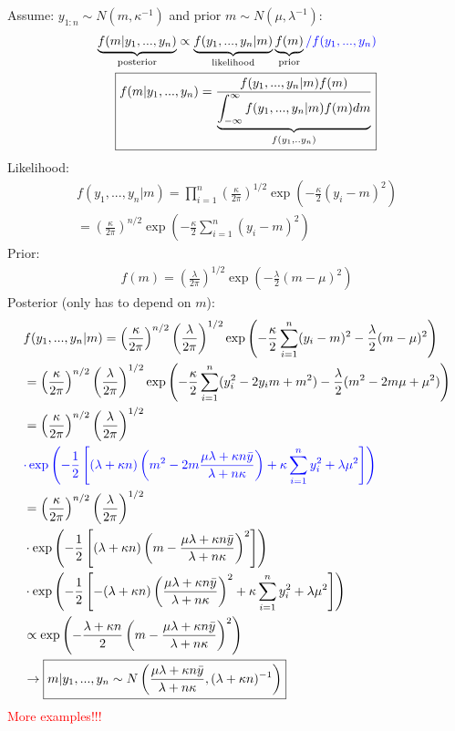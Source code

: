 \documentclass{article}\usepackage[]{graphicx}\usepackage[]{xcolor}
\begin{document}
\begin{multicols*}{2}
\begin{center}
\begin{tabular}{lll}
\end{tabular}
\end{center}
Assume: $y_{1:n}\sim N(m,\kappa^{-1})$ and prior $m\sim N(\mu,\lambda^{-1})$:
\begin{align*}
\underbrace{f(m|y_1,...,y_n)}_{\text{posterior}}\propto\underbrace{f(y_1,...,y_n|m)}_{\text{likelihood}}\underbrace{f(m)}_{\text{prior}}\textcolor{blue}{/f(y_1,...,y_n)}\\
\boxed{f(m|y_1,...,y_n)=\frac{f(y_1,...,y_n|m)f(m)}{\underbrace{\int_{-\infty}^{\infty}f(y_1,...,y_n|m)f(m)dm}_{f(y_1,..y_n)}}}
\end{align*}
Likelihood:
\begin{align*}
f(y_1,...,y_n|m)=\prod_{i=1}^{n}\left(\frac{\kappa}{2\pi}\right)^{1/2}\exp\left(-\frac{\kappa}{2}(y_i-m)^2\right)\\
=\left(\frac{\kappa}{2\pi}\right)^{n/2}\exp\left(-\frac{\kappa}{2}\sum_{i=1}^{n}(y_i-m)^2\right)
\end{align*}
Prior:
\begin{align*}
f(m)=\left(\frac{\lambda}{2\pi}\right)^{1/2}\exp\left(-\frac{\lambda}{2}(m-\mu)^2\right)
\end{align*}
Posterior (only has to depend on $m$):
\begin{align*}
&f(y_1,...,y_n|m)=\left(\frac{\kappa}{2\pi}\right)^{n/2}\left(\frac{\lambda}{2\pi}\right)^{1/2}\exp\left(-\frac{\kappa}{2}\sum_{i=1}^{n}(y_i-m)^2-\frac{\lambda}{2}(m-\mu)^2\right)\\
&=\left(\frac{\kappa}{2\pi}\right)^{n/2}\left(\frac{\lambda}{2\pi}\right)^{1/2}\exp\left(-\frac{\kappa}{2}\sum_{i=1}^{n}(y_i^2-2y_i m+m^2)-\frac{\lambda}{2}(m^2-2m\mu+\mu^2)\right)\\
&=\left(\frac{\kappa}{2\pi}\right)^{n/2}\left(\frac{\lambda}{2\pi}\right)^{1/2}\\
&\textcolor{blue}{\cdot\exp\left(-\frac{1}{2}\left[(\lambda+\kappa n)\left(m^2-2m\frac{\mu\lambda+\kappa n\bar{y}}{\lambda+n\kappa}\right)+\kappa\sum_{i=1}^{n}y_i^2 + \lambda\mu^2\right]\right)}\\
&=\left(\frac{\kappa}{2\pi}\right)^{n/2}\left(\frac{\lambda}{2\pi}\right)^{1/2}\\
&\cdot\exp\left(-\frac{1}{2}\left[(\lambda+\kappa n)\left(m-\frac{\mu\lambda+\kappa n\bar{y}}{\lambda+n\kappa}\right)^2\right]\right)\\
&\cdot\exp\left(-\frac{1}{2}\left[-(\lambda+\kappa n)\left(\frac{\mu\lambda+\kappa n\bar{y}}{\lambda+n\kappa}\right)^2+\kappa\sum_{i=1}^{n}y_i^2 + \lambda\mu^2\right]\right)\\
&\propto\exp\left(-\frac{\lambda+\kappa n}{2}\left(m-\frac{\mu\lambda+\kappa n\bar{y}}{\lambda+n\kappa}\right)^2\right)\\
&\rightarrow \boxed{m|y_1,...,y_n\sim N\left(\frac{\mu\lambda+\kappa n\bar{y}}{\lambda+n\kappa},(\lambda+\kappa n)^{-1}\right)}
\end{align*}
\textcolor{red}{More examples!!!}


\end{multicols*}
\end{document}
